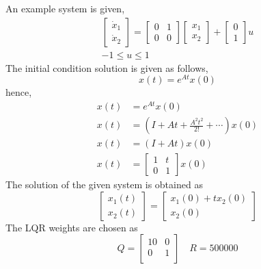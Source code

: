 An example system is given,
\begin{equation}
\begin{split}
    \begin{bmatrix}
        \dot{x}_1\\\dot{x}_2
    \end{bmatrix}=\begin{bmatrix}
        0& 1\\0& 0
    \end{bmatrix}\begin{bmatrix}
        x_1\\x_2
    \end{bmatrix}+\begin{bmatrix}
        0\\1
    \end{bmatrix}u\\
    -1\leq u\leq 1
\end{split}
\end{equation}
The initial condition solution is given as follows,
\begin{equation}
    x(t)=e^{At}x(0)
\end{equation}
hence,
\begin{equation}
\begin{split}
    x(t)&=e^{At}x(0)\\
    x(t)&=\left(I+At+\frac{A^2t^2}{2!}+\cdots\right)x(0)\\
    x(t)&=(I+At)x(0)\\
    x(t)&=\begin{bmatrix}1&t\\0&1\end{bmatrix}x(0)
\end{split}
\end{equation}
The solution of the given system is obtained as
\begin{equation}
    \begin{bmatrix}
        x_1(t)\\x_2(t)
    \end{bmatrix}=\begin{bmatrix}
        x_1(0)+t x_2(0)\\x_2(0)
    \end{bmatrix}
\end{equation}
The LQR weights are chosen as
\begin{equation}
    Q=\begin{bmatrix}
        10&     0\\
        0&     1\\
    \end{bmatrix}\quad R=500000
\end{equation}

